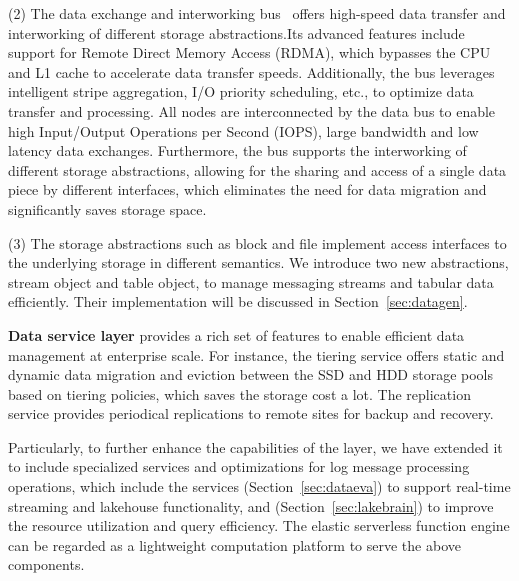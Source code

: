

(2) The data exchange and interworking bus~\cite{huawei} offers high-speed data transfer and interworking of different storage abstractions.Its advanced features include support for Remote Direct Memory Access (RDMA), which bypasses the CPU and L1 cache to accelerate data transfer speeds. Additionally, the bus leverages intelligent stripe aggregation, I/O priority scheduling, etc., to optimize data transfer and processing.
All nodes are interconnected by the data bus to enable high  Input/Output Operations per Second (IOPS), large bandwidth and low latency data exchanges. Furthermore, the bus supports the interworking of different storage abstractions, allowing for the sharing and  access of a single data piece by different interfaces, which eliminates the need for data migration and significantly saves storage space.

(3) The storage abstractions such as block and file  implement access interfaces to the underlying storage in different semantics. We introduce two new abstractions, stream object and table object, to manage messaging streams and tabular data efficiently. 
Their implementation will be discussed in Section~\ref{sec:datagen}.


\noindent \textbf{Data service layer} provides a rich set of features to enable efficient data management at enterprise scale. For instance, the tiering service offers static and dynamic data migration and eviction between the SSD and HDD storage pools based on tiering policies, which saves the storage cost a lot. The replication service provides periodical replications to remote sites for backup and recovery. 

Particularly, to further enhance the capabilities of the layer, we have extended it to include specialized services and optimizations for log message processing operations, which include the \sys  services (Section~\ref{sec:dataeva}) to support real-time streaming and lakehouse functionality, and \brain (Section~\ref{sec:lakebrain}) to improve the resource utilization and query efficiency.
 The elastic serverless function engine can be regarded as a lightweight computation platform to serve the above components.


